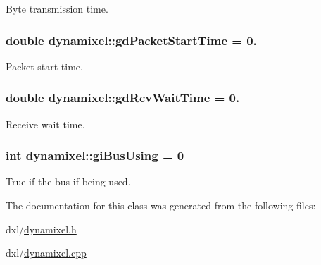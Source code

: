 Byte transmission time. 

\hypertarget{classdynamixel_a6c6314fb7070e6fd361e57c5de17e0ec}{}
\subsubsection[{gd\+Packet\+Start\+Time}]{\setlength{\rightskip}{0pt plus 5cm}double dynamixel\+::gd\+Packet\+Start\+Time = 0.\hspace{0.3cm}{\ttfamily [private]}}\label{classdynamixel_a6c6314fb7070e6fd361e57c5de17e0ec}


Packet start time. 

\hypertarget{classdynamixel_a9f47887864517d74955a2bc787ae4456}{}
\subsubsection[{gd\+Rcv\+Wait\+Time}]{\setlength{\rightskip}{0pt plus 5cm}double dynamixel\+::gd\+Rcv\+Wait\+Time = 0.\hspace{0.3cm}{\ttfamily [private]}}\label{classdynamixel_a9f47887864517d74955a2bc787ae4456}


Receive wait time. 

\hypertarget{classdynamixel_ad10e0e49f5fef04bf789a89c14cc470a}{}
\subsubsection[{gi\+Bus\+Using}]{\setlength{\rightskip}{0pt plus 5cm}int dynamixel\+::gi\+Bus\+Using = 0\hspace{0.3cm}{\ttfamily [private]}}\label{classdynamixel_ad10e0e49f5fef04bf789a89c14cc470a}


True if the bus if being used. 



The documentation for this class was generated from the following files\+:\begin{DoxyCompactItemize}
\item 
dxl/\hyperlink{dynamixel_8h}{dynamixel.\+h}\item 
dxl/\hyperlink{dynamixel_8cpp}{dynamixel.\+cpp}\end{DoxyCompactItemize}
